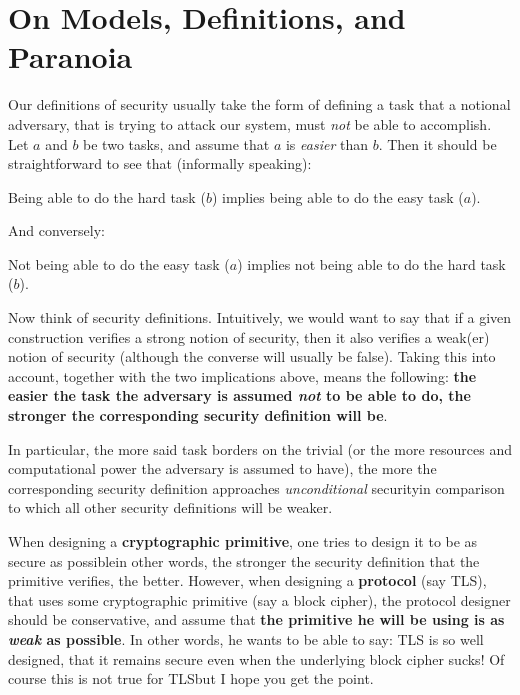 \section{On Models, Definitions, and Paranoia}
  \label{sec:on_mdp}
  Our definitions of security usually take the form of defining a task that a notional adversary, that is trying to attack our system, must \emph{not} be able to accomplish. Let $a$ and $b$ be two tasks, and assume that $a$ is \emph{easier} than $b$. Then it should be straightforward to see that (informally speaking):
  \begin{center}
    Being able to do the hard task ($b$) implies being able to do the easy task ($a$).
  \end{center}
  And conversely:
  \begin{center}
    Not being able to do the easy task ($a$) implies not being able to do the hard task ($b$).
  \end{center}
  Now think of security definitions. Intuitively, we would want to say that if a given construction verifies a strong notion of security, then it also verifies a weak(er) notion of security (although the converse will usually be false). Taking this into account, together with the two implications above, means the following: \textbf{the easier the task the adversary is assumed \textit{not} to be able to do, the stronger the corresponding security definition will be}.

  In particular, the more said task borders on the trivial (or the more resources and computational power the adversary is assumed to have), the more the corresponding security definition approaches \emph{unconditional} security\emd in comparison to which all other security definitions will be weaker.

  \medskip

   When designing a \textbf{cryptographic primitive}, one tries to design it to be as secure as possible\emd in other words, the stronger the security definition that the primitive verifies, the better. However, when designing a \textbf{protocol} (say TLS), that uses some cryptographic primitive (say a block cipher), the protocol designer should be conservative, and assume that \textbf{the primitive he will be using is as \textit{weak} as possible}. In other words, he wants to be able to say: TLS is so well designed, that it remains secure even when the underlying block cipher sucks! Of course this is not true for TLS\emd but I hope you get the point.

